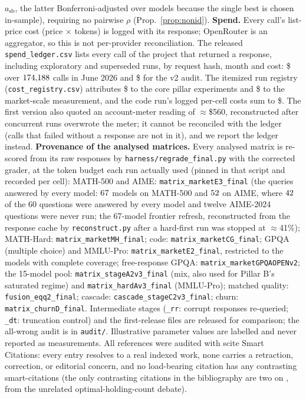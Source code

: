 \documentclass[11pt]{article}
\theoremstyle{plain}
\theoremstyle{definition}
\begin{document}
$a_{\mathrm{sb}}$, the latter Bonferroni-adjusted over models because the single best is chosen in-sample), requiring no
pairwise $\rho$ (Prop.~\ref{prop:nonid}). \textbf{Spend.} Every call's list-price cost (price $\times$ tokens) is logged with its response; OpenRouter is an
aggregator, so this is not per-provider reconciliation. The released \texttt{spend\_ledger.csv} lists every call of the
project that returned a response, including exploratory and superseded runs, by request hash, month and cost: \$\nSpendJune{} over $174{,}188$ calls in
June 2026 and \$\nSpendAudit{} for the v2 audit. The itemized run registry (\texttt{cost\_registry.csv}) attributes
\$\nCostCore{} to the core pillar experiments and \$\nCostMarket{} to the market-scale measurement, and the code run's logged
per-cell costs sum to \$\nCostCode. The first version also quoted an account-meter reading of $\approx$\$560, reconstructed after
concurrent runs overwrote the meter; it cannot be reconciled with the ledger (calls that failed without a response are not in
it), and we report the ledger instead.
\textbf{Provenance of the analysed matrices.} Every analysed matrix is re-scored from its raw responses by
\texttt{harness/regrade\_final.py} with the corrected grader, at the token budget each run actually used (pinned in that
script and recorded per cell): MATH-500 and AIME: \texttt{matrix\_marketE3\_final} (the queries answered by every model: $67$ models on
MATH-500 and $52$ on AIME, where $42$ of the $60$ questions were answered by every model and twelve AIME-2024
questions were never run; the 67-model frontier refresh, reconstructed from the response cache by \texttt{reconstruct.py} after a hard-first run
was stopped at $\approx$41\%); MATH-Hard: \texttt{matrix\_marketMH\_final}; code: \texttt{matrix\_marketCG\_final}; GPQA (multiple
choice) and MMLU-Pro: \texttt{matrix\_marketE2\_final}, restricted to the models with complete coverage; free-response GPQA:
\texttt{matrix\_marketGPQAOPENv2}; the 15-model pool: \texttt{matrix\_stageA2v3\_final} (mix, also used for Pillar B's saturated
regime) and \texttt{matrix\_hardAv3\_final} (MMLU-Pro); matched quality: \texttt{fusion\_eqq2\_final}; cascade:
\texttt{cascade\_stageC2v3\_final}; churn: \texttt{matrix\_churnD\_final}. Intermediate stages (\texttt{\_rr}: corrupt responses
re-queried; \texttt{\_dt}: truncation control) and the first-release files are released for comparison; the all-wrong audit is in
\texttt{audit/}. Illustrative parameter values are labelled and never reported as measurements.
All references were audited with scite Smart Citations: every entry resolves to a real indexed work, none carries a retraction,
correction, or editorial concern, and no load-bearing citation has any contrasting smart-citations (the only contrasting
citations in the bibliography are two on \citet{statman1987}, from the unrelated optimal-holding-count debate).
\end{document}
